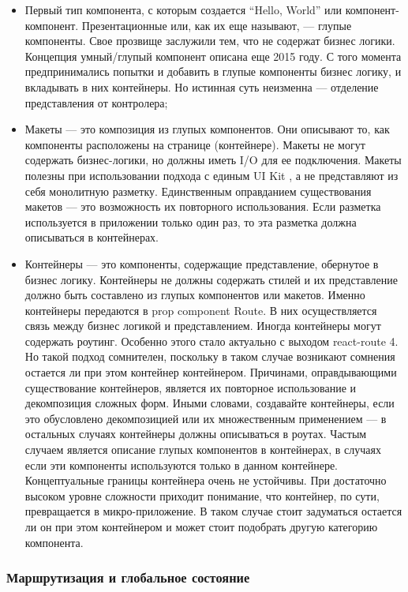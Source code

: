\begin{itemize}
    \item Первый тип компонента, с которым создается “Hello, World” или компонент-компонент.
    Презентационные или, как их еще называют, — глупые компоненты. Свое прозвище заслужили тем, что не содержат бизнес логики.
    Концепция умный/глупый компонент описана еще 2015 году.
    С того момента предпринимались попытки и добавить в глупые компоненты бизнес логику, и вкладывать в них контейнеры.
    Но истинная суть неизменна — отделение представления от контролера;
    \item Макеты — это композиция из глупых компонентов.
    Они описывают то, как компоненты расположены на странице (контейнере).
    Макеты не могут содержать бизнес-логики, но должны иметь I/O для ее подключения.
    Макеты полезны при использовании подхода с единым UI Kit , а не представляют из себя монолитную разметку.
    Единственным оправданием существования макетов — это возможность их повторного использования.
    Если разметка используется в приложении только один раз, то эта разметка должна описываться в контейнерах.
    \item Контейнеры — это компоненты, содержащие представление, обернутое в бизнес логику.
    Контейнеры не должны содержать стилей и их представление должно быть составлено из глупых компонентов или макетов.
    Именно контейнеры передаются в prop component Route. В них осуществляется связь между бизнес логикой и представлением.
    Иногда контейнеры могут содержать роутинг. Особенно этого стало актуально с выходом react-route 4.
    Но такой подход сомнителен, поскольку в таком случае возникают сомнения остается ли при этом контейнер контейнером.
    Причинами, оправдывающими существование контейнеров, является их повторное использование и декомпозиция сложных форм.
    Иными словами, создавайте контейнеры, если это обусловлено декомпозицией или их множественным применением — в остальных случаях контейнеры должны описываться в роутах.
    Частым случаем является описание глупых компонентов в контейнерах, в случаях если эти компоненты используются только в данном контейнере.
    Концептуальные границы контейнера очень не устойчивы.
    При достаточно высоком уровне сложности приходит понимание, что контейнер, по сути, превращается в микро-приложение.
    В таком случае стоит задуматься остается ли он при этом контейнером и может стоит подобрать другую категорию компонента.
\end{itemize}

\subsubsection{Маршрутизация и глобальное состояние}

